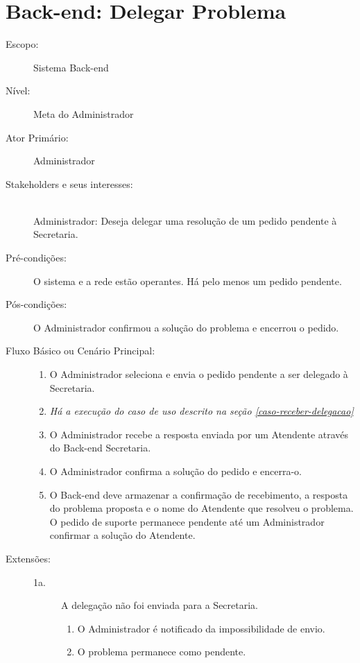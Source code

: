 \documentclass[brazil,times]{abnt}
\begin{document}
\section{Back-end: Delegar Problema}\label{delegar-problema}
\begin{description}
\item[Escopo:] Sistema Back-end
\item[Nível:] Meta do Administrador
\item[Ator Primário:] Administrador
\item[Stakeholders e seus interesses:] \hfill \\
Administrador: Deseja delegar uma resolução de um pedido pendente à Secretaria.

\item[Pré-condições:] O sistema e a rede estão operantes. Há pelo menos um pedido
pendente.

\item[Pós-condições:] O Administrador confirmou a solução do problema e encerrou
o pedido.
\item[Fluxo Básico ou Cenário Principal:]\hfill
\begin{enumerate}
  \item O Administrador seleciona e envia o pedido pendente a ser delegado à
  Secretaria.
  \item \emph{Há a execução do caso de uso descrito na seção
  \ref{caso-receber-delegacao}}
  \item O Administrador recebe a resposta enviada por um Atendente através do
  Back-end Secretaria.
  \item O Administrador confirma a solução do pedido e encerra-o.
  \item O Back-end deve armazenar a confirmação de recebimento, a resposta
  do problema proposta e o nome do Atendente que resolveu o problema. O pedido
  de suporte permanece pendente até um Administrador confirmar a solução do Atendente.
\end{enumerate}

\item[Extensões:]\hfill
\begin{description}
	\item[1a.] A delegação não foi enviada para a Secretaria.
	\begin{enumerate}
		\item O Administrador é notificado da impossibilidade de envio.
		\item O problema permanece como pendente.
	\end{enumerate}


\end{description}
\end{description}
\end{document}

